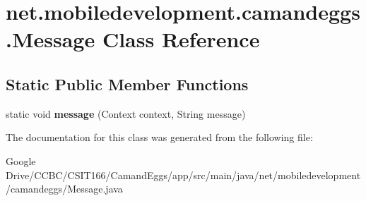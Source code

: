 \hypertarget{classnet_1_1mobiledevelopment_1_1camandeggs_1_1_message}{}\section{net.\+mobiledevelopment.\+camandeggs.\+Message Class Reference}
\label{classnet_1_1mobiledevelopment_1_1camandeggs_1_1_message}
\subsection*{Static Public Member Functions}
\begin{DoxyCompactItemize}
\item 
\mbox{\label{classnet_1_1mobiledevelopment_1_1camandeggs_1_1_message_a4747588bc5300eda5350425cf9114151}} 
static void {\bfseries message} (Context context, String message)
\end{DoxyCompactItemize}


The documentation for this class was generated from the following file\+:\begin{DoxyCompactItemize}
\item 
Google Drive/\+C\+C\+B\+C/\+C\+S\+I\+T166/\+Camand\+Eggs/app/src/main/java/net/mobiledevelopment/camandeggs/Message.\+java\end{DoxyCompactItemize}
